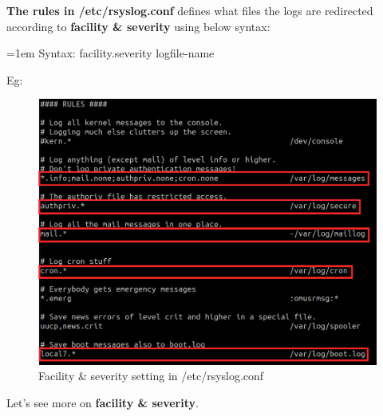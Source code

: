 \setlength{\columnsep}{3pt}
\begin{flushleft}
\bigskip
\bigskip

\textbf{The rules in /etc/rsyslog.conf} defines what files the logs are redirected according to \textbf{facility \& severity} using below syntax:

\begin{tcolorbox}[breakable,notitle,boxrule=-0pt,colback=pink,colframe=pink]
	\color{black}
	\font=1em
	Syntax: facility.severity      logfile-name
	\font=4pt
\end{tcolorbox}

Eg:
\begin{figure}[h!]
	\centering
	\includegraphics[scale=0.4]{content/chapter16/images/rsyslog.png}
	\caption{Facility \& severity setting in /etc/rsyslog.conf}
	\label{fig:s1everity}
\end{figure}

Let's see more on \textbf{facility \& severity}.

\newpage


\end{flushleft}
